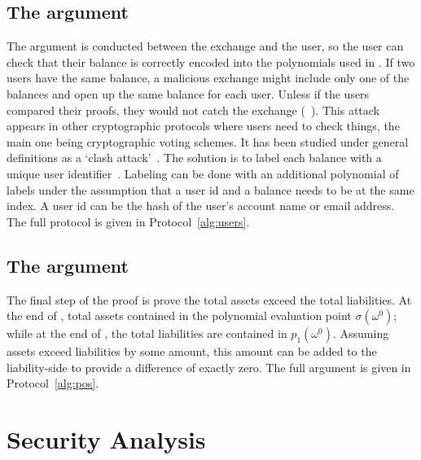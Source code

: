 

\subsection{The \userproof argument}


The \userproof argument is conducted between the exchange and the user, so the user can check that their balance is correctly encoded into the polynomials used in \pol. If two users have the same balance, a malicious exchange might include only one of the balances and open up the same balance for each user. Unless if the users compared their proofs, they would not catch the exchange (\cf~\cite{broken}). This attack appears in other cryptographic protocols where users need to check things, the main one being cryptographic voting schemes. It has been studied under general definitions as a `clash attack'~\cite{clash}. The solution is to label each balance with a unique user identifier~\cite{provisions}. Labeling can be done with an additional polynomial of labels under the assumption that a user id and a balance needs to be at the same index. A user id can be the hash of the user's account name or email address.  The full protocol is given in Protocol~\ref{alg:users}.


\subsection{The \pos argument}


The final step of the proof is prove the total assets exceed the total liabilities. At the end of \poa, total assets contained in the polynomial evaluation point $\sigma(\omega^0)$; while at the end of \pol, the total liabilities are contained in $p_1(\omega^0)$. Assuming assets exceed liabilities by some amount, this amount can be added to the liability-side to provide a difference of exactly zero. The full argument is given in Protocol~\ref{alg:pos}.




\section{Security Analysis}
\label{sec:proof}

